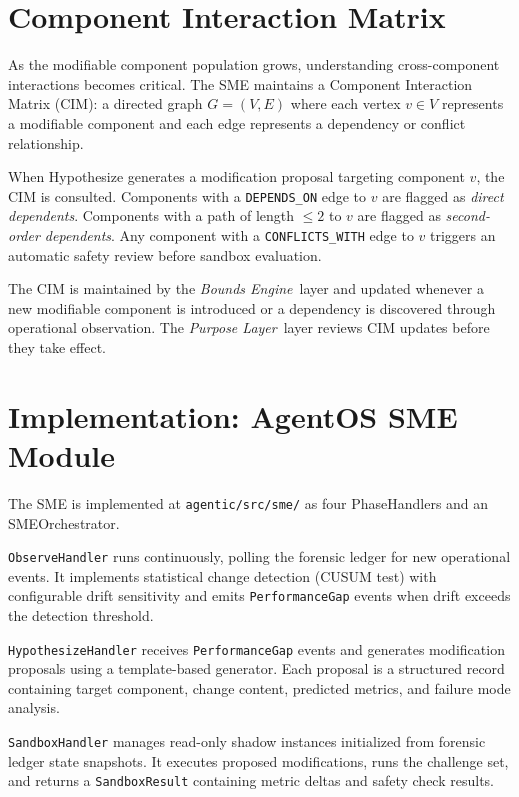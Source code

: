 \documentclass[12pt]{article}
\newcommand{\purpose}{\textit{Purpose Layer}}
\newcommand{\bounds}{\textit{Bounds Engine}}
\begin{document}
\section{Component Interaction Matrix}
\label{sec:interaction-matrix}

As the modifiable component population grows, understanding cross-component interactions becomes critical. The SME maintains a Component Interaction Matrix (CIM): a directed graph $G = (V, E)$ where each vertex $v \in V$ represents a modifiable component and each edge represents a dependency or conflict relationship.

When Hypothesize generates a modification proposal targeting component $v$, the CIM is consulted. Components with a \texttt{DEPENDS\_ON} edge to $v$ are flagged as \textit{direct dependents}. Components with a path of length $\leq 2$ to $v$ are flagged as \textit{second-order dependents}. Any component with a \texttt{CONFLICTS\_WITH} edge to $v$ triggers an automatic safety review before sandbox evaluation.

The CIM is maintained by the \bounds\ layer and updated whenever a new modifiable component is introduced or a dependency is discovered through operational observation. The \purpose\ layer reviews CIM updates before they take effect.

\section{Implementation: AgentOS SME Module}
\label{sec:implementation}

The SME is implemented at \texttt{agentic/src/sme/} as four PhaseHandlers and an SMEOrchestrator.

\medskip
\noindent
\texttt{ObserveHandler} runs continuously, polling the forensic ledger for new operational events. It implements statistical change detection (CUSUM test) with configurable drift sensitivity and emits \texttt{PerformanceGap} events when drift exceeds the detection threshold.

\medskip
\noindent
\texttt{HypothesizeHandler} receives \texttt{PerformanceGap} events and generates modification proposals using a template-based generator. Each proposal is a structured record containing target component, change content, predicted metrics, and failure mode analysis.

\medskip
\noindent
\texttt{SandboxHandler} manages read-only shadow instances initialized from forensic ledger state snapshots. It executes proposed modifications, runs the challenge set, and returns a \texttt{SandboxResult} containing metric deltas and safety check results.
\end{document}
